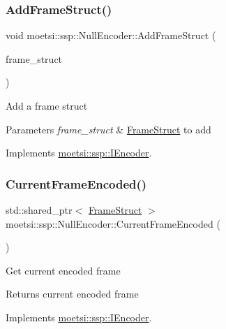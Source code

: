 \subsubsection{\texorpdfstring{Add\+Frame\+Struct()}{AddFrameStruct()}}
{\footnotesize\ttfamily void moetsi\+::ssp\+::\+Null\+Encoder\+::\+Add\+Frame\+Struct (\begin{DoxyParamCaption}\item[{std\+::shared\+\_\+ptr$<$ \hyperlink{structmoetsi_1_1ssp_1_1FrameStruct}{Frame\+Struct} $>$ \&}]{frame\+\_\+struct }\end{DoxyParamCaption})\hspace{0.3cm}{\ttfamily [virtual]}}

Add a frame struct 
\begin{DoxyParams}{Parameters}
{\em frame\+\_\+struct} & \hyperlink{structmoetsi_1_1ssp_1_1FrameStruct}{Frame\+Struct} to add \\
\hline
\end{DoxyParams}


Implements \hyperlink{classmoetsi_1_1ssp_1_1IEncoder_a8c223ec82fdd30ee8ee75157306054ec}{moetsi\+::ssp\+::\+I\+Encoder}.

\mbox{\label{classmoetsi_1_1ssp_1_1NullEncoder_ae48926f99c368849ee8822aed10ac1b5}} 
\subsubsection{\texorpdfstring{Current\+Frame\+Encoded()}{CurrentFrameEncoded()}}
{\footnotesize\ttfamily std\+::shared\+\_\+ptr$<$ \hyperlink{structmoetsi_1_1ssp_1_1FrameStruct}{Frame\+Struct} $>$ moetsi\+::ssp\+::\+Null\+Encoder\+::\+Current\+Frame\+Encoded (\begin{DoxyParamCaption}{ }\end{DoxyParamCaption})\hspace{0.3cm}{\ttfamily [virtual]}}

Get current encoded frame \begin{DoxyReturn}{Returns}
current encoded frame 
\end{DoxyReturn}


Implements \hyperlink{classmoetsi_1_1ssp_1_1IEncoder_a178d117518e7c7007414ea9c82bd3ed6}{moetsi\+::ssp\+::\+I\+Encoder}.

